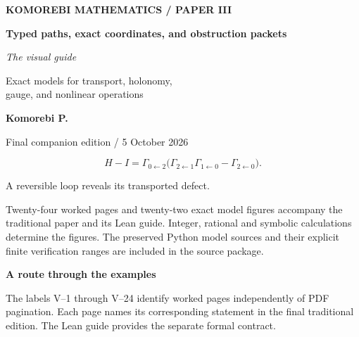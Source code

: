 \documentclass[11pt,a4paper]{article}
\begin{document}
\begin{titlepage}
\thispagestyle{empty}
\vspace*{14mm}
{\sffamily\bfseries\small\color{accent}KOMOREBI MATHEMATICS / PAPER III}\par
\vspace{5mm}{\color{accent}\rule{\linewidth}{1pt}}\par
\vspace{12mm}
{\sffamily\bfseries\fontsize{32}{36}\selectfont Typed paths, exact coordinates, and obstruction packets\par}
\vspace{9mm}
{\fontsize{23}{28}\selectfont\itshape The visual guide\par}
\vspace{8mm}
{\large Exact models for transport, holonomy,\\gauge, and nonlinear operations\par}
\vspace{15mm}
{\sffamily\bfseries Komorebi P.}\par
{\sffamily\small\color{muted}Final companion edition / 5 October 2026}\par
\vfill
{\Large\[H-I=\Gamma_{0\leftarrow2}\bigl(\Gamma_{2\leftarrow1}\Gamma_{1\leftarrow0}-\Gamma_{2\leftarrow0}\bigr).\]}
\begin{center}\small A reversible loop reveals its transported defect.\end{center}
\vfill
\begin{minipage}{.96\linewidth}
Twenty-four worked pages and twenty-two exact model figures accompany the
traditional paper and its Lean guide. Integer, rational and symbolic
calculations determine the figures. The preserved Python model sources and
their explicit finite verification ranges are included in the source package.
\end{minipage}
\end{titlepage}
{\sffamily\bfseries\Large\color{accent}A route through the examples}\par\medskip
The labels V--1 through V--24 identify worked pages independently of PDF
pagination. Each page names its corresponding statement in the final
traditional edition. The Lean guide provides the separate formal contract.
\medskip
\end{document}
